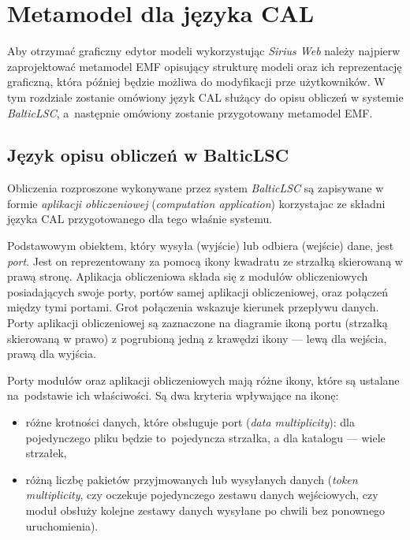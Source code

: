\chapter{Metamodel dla języka CAL}

Aby otrzymać graficzny edytor modeli wykorzystując \emph{Sirius Web} należy
najpierw zaprojektować metamodel \gls{EMF} opisujący strukturę modeli oraz ich
reprezentację graficzną, która później będzie możliwa do modyfikacji prze
użytkowników. W tym rozdziale
zostanie omówiony język \acrfull{CAL} służący do opisu obliczeń w systemie
\emph{BalticLSC}, a~następnie omówiony zostanie przygotowany metamodel
\gls{EMF}.

\section{Język opisu obliczeń w BalticLSC}

Obliczenia rozproszone wykonywane przez system \emph{BalticLSC} są zapisywane w
formie \emph{aplikacji obliczeniowej} (\emph{computation application})
korzystajac ze składni języka \acrfull{CAL} przygotowanego dla tego właśnie
systemu.

Podstawowym obiektem, który wysyła (wyjście)
lub odbiera (wejście) dane, jest \emph{port}. Jest on reprezentowany za pomocą
ikony kwadratu ze strzałką skierowaną w prawą stronę. Aplikacja obliczeniowa
składa
się z modułów obliczeniowych posiadających swoje porty, portów samej aplikacji
obliczeniowej, oraz połączeń między tymi portami. Grot połączenia wskazuje
kierunek przepływu danych.
Porty aplikacji obliczeniowej są zaznaczone na
diagramie ikoną portu (strzałką skierowaną w prawo) z pogrubioną
jedną z krawędzi ikony --- lewą dla wejścia, prawą dla wyjścia.

Porty modułów oraz aplikacji obliczeniowych mają różne ikony, które
są ustalane na~podstawie ich właściwości. Są dwa kryteria wpływające na ikonę:

\begin{itemize}
	\item różne krotności danych, które obsługuje port (\emph{data
		      multiplicity}):  dla pojedynczego pliku będzie to~pojedyncza strzałka, a dla katalogu --- wiele strzałek,
	\item różną liczbę pakietów przyjmowanych lub wysyłanych danych (\emph{token
		      multiplicity}, czy oczekuje pojedynczego zestawu danych wejściowych, czy moduł obsłuży kolejne zestawy danych wysyłane po chwili bez ponownego uruchomienia).
\end{itemize}

